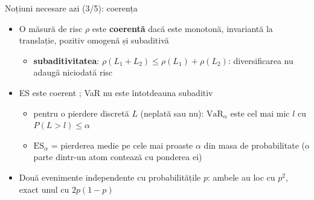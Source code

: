 \begin{frame}{Noțiuni necesare azi (3/5): coerența}
\itemsize{\small}
\begin{itemize}
    \item O măsură de risc $\rho$ este \textbf{coerentă}  dacă este monotonă, invariantă la translație, pozitiv omogenă și subaditivă
    \begin{itemize}
        \item \textbf{subaditivitatea}: $\rho(L_1 + L_2) \le \rho(L_1) + \rho(L_2)$: diversificarea nu adaugă niciodată risc
    \end{itemize}
    \item ES este coerent ; VaR nu este întotdeauna subaditiv
    \begin{itemize}
        \item pentru o pierdere discretă $L$ (neplată sau nu): $\mathrm{VaR}_\alpha$ este cel mai mic $l$ cu $P(L > l) \le \alpha$
        \item $\mathrm{ES}_\alpha$ = pierderea medie pe cele mai proaste $\alpha$ din masa de probabilitate (o parte dintr-un atom contează cu ponderea ei)
    \end{itemize}
    \item Două evenimente independente cu probabilitățile $p$: ambele au loc cu $p^2$, exact unul cu $2p(1 - p)$
\end{itemize}
\end{frame}

